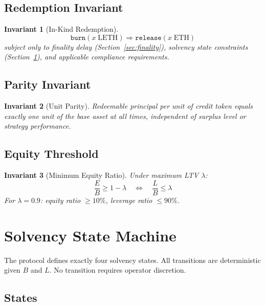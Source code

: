 \documentclass[11pt,twocolumn]{article}
\newtheorem{invariant}{Invariant}[section]
\theoremstyle{remark}
\begin{document}
\subsection{Redemption Invariant}

\begin{invariant}[In-Kind Redemption]
\label{inv:redemption}
\begin{equation}
  \texttt{burn}(x\;\text{LETH}) \Rightarrow \texttt{release}(x\;\text{ETH})
\end{equation}
subject only to finality delay (Section~\ref{sec:finality}), solvency state constraints (Section~\ref{sec:state-machine}), and applicable compliance requirements.
\end{invariant}

\subsection{Parity Invariant}

\begin{invariant}[Unit Parity]
\label{inv:parity}
Redeemable principal per unit of credit token equals exactly one unit of the base asset at all times, independent of surplus level or strategy performance.
\end{invariant}

\subsection{Equity Threshold}

\begin{invariant}[Minimum Equity Ratio]
\label{inv:equity}
Under maximum LTV $\lambda$:
\begin{equation}
  \frac{E}{B} \geq 1 - \lambda \quad\Leftrightarrow\quad \frac{L}{B} \leq \lambda
\end{equation}
For $\lambda = 0.9$: equity ratio $\geq 10\%$, leverage ratio $\leq 90\%$.
\end{invariant}


\section{Solvency State Machine}
\label{sec:state-machine}

The protocol defines exactly four solvency states. All transitions are deterministic given $B$ and $L$. No transition requires operator discretion.

\subsection{States}
\end{document}
